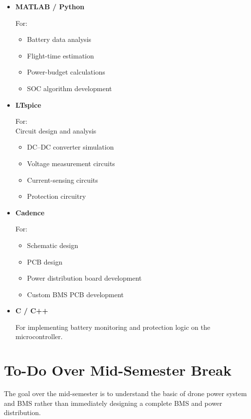 \documentclass{article}
\begin{document}
\begin{itemize}

\item \textbf{MATLAB / Python}

For:
\begin{itemize}
    \item Battery data analysis
    \item Flight-time estimation
    \item Power-budget calculations
    \item SOC algorithm development
\end{itemize}

\item \textbf{LTspice}

For:\\
Circuit design and analysis
\begin{itemize}
    \item DC--DC converter simulation
    \item Voltage measurement circuits
    \item Current-sensing circuits
    \item Protection circuitry
\end{itemize}

\item \textbf{Cadence}

For:
\begin{itemize}
    \item Schematic design
    \item PCB design
    \item Power distribution board development
    \item Custom BMS PCB development
\end{itemize}

\item \textbf{C / C++}

For implementing battery monitoring and protection logic on the microcontroller.

\end{itemize}



\section{To-Do Over Mid-Semester Break}

The goal over the mid-semester is to understand the basic of drone power system and BMS rather than immediately designing a complete BMS and power distribution.
\end{document}
